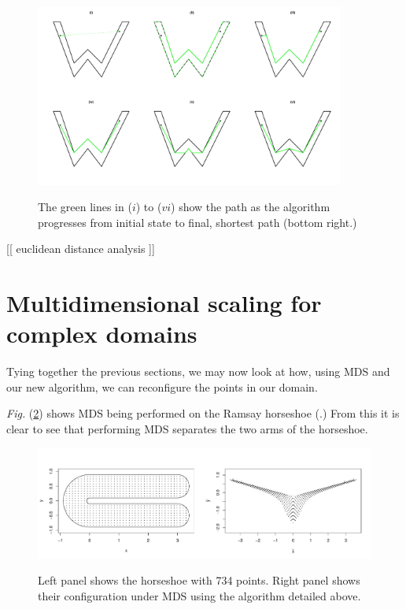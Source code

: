 \documentclass[a4paper,10pt]{amsart}
\newcommand{\Fig}[1]{\emph{Fig.} (\ref{#1})}
\begin{document}
\begin{figure}
\centering
\includegraphics[trim=0in 0.5in 0in 0.25in, width=4in]{figs/wdia.pdf} \\
\caption{The green lines in ($i$) to ($vi$) show the path as the algorithm progresses from initial state to final, shortest path (bottom right.) }
\label{wdia}
\end{figure}



[[ euclidean distance analysis ]]


\section{Multidimensional scaling for complex domains}

Tying together the previous sections, we may now look at how, using MDS and our new algorithm, we can reconfigure the points in our domain.

\Fig{ramsay-mds} shows MDS being performed on the Ramsay horseshoe (\cite{ramsay}.) From this it is clear to see that performing MDS separates the two arms of the horseshoe.

\begin{figure}
\centering
\includegraphics[trim=0in 0.5in 0in 0.25in, width=5.5in]{figs/ramsay-mds.pdf} \\
\caption{Left panel shows the horseshoe with 734 points. Right panel shows their configuration under MDS using the algorithm detailed above.}
\label{ramsay-mds}
\end{figure}
\end{document}
